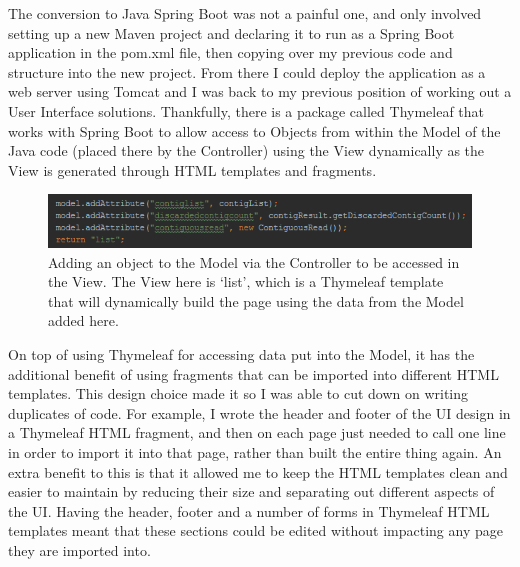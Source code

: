 The conversion to Java Spring Boot was not a painful one, and only involved setting up a new Maven project and declaring it to run as a Spring Boot application in the pom.xml file, then copying over my previous code and structure into the new project. From there I could deploy the application as a web server using Tomcat and I was back to my previous position of working out a User Interface solutions. Thankfully, there is a package called Thymeleaf\cite{thymeleaf} that works with Spring Boot to allow access to Objects from within the Model of the Java code (placed there by the Controller) using the View dynamically as the View is generated through HTML templates and fragments.

\begin{figure}[H]
	\centering
\includegraphics[width=1\textwidth]{images/addingtomodel}
\caption{Adding an object to the Model via the Controller to be accessed in the View. The View here is `list', which is a Thymeleaf template that will dynamically build the page using the data from the Model added here.}
\end{figure}

On top of using Thymeleaf for accessing data put into the Model, it has the additional benefit of using fragments that can be imported into different HTML templates. This design choice made it so I was able to cut down on writing duplicates of code. For example, I wrote the header and footer of the UI design in a Thymeleaf HTML fragment, and then on each page just needed to call one line in order to import it into that page, rather than built the entire thing again. An extra benefit to this is that it allowed me to keep the HTML templates clean and easier to maintain by reducing their size and separating out different aspects of the UI. Having the header, footer and a number of forms in Thymeleaf HTML templates meant that these sections could be edited without impacting any page they are imported into.

